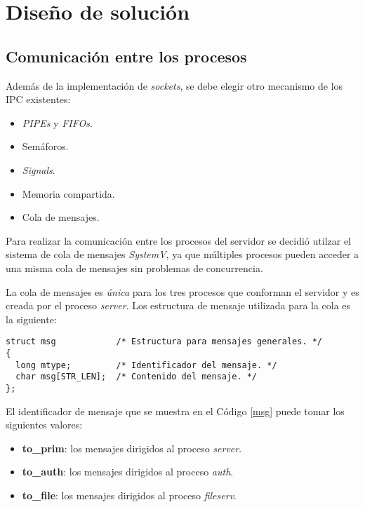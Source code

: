 \documentclass[12pt,a4paper]{article}
\begin{document}
\newpage

\section{Diseño de solución}
\label{solucion}

\subsection{Comunicación entre los procesos}
\label{ipc}
Además de la implementación de \emph{sockets}, se debe elegir
otro mecanismo de los IPC existentes:

\begin{itemize}[leftmargin=1.5cm]
  \item \emph{PIPEs} y \emph{FIFOs}.
  \item Semáforos.
  \item \emph{Signals}.
  \item Memoria compartida.
  \item Cola de mensajes.
\end{itemize}

Para realizar la comunicación entre los procesos del servidor se
decidió utilzar el sistema de cola de mensajes \emph{SystemV}, ya
que múltiples procesos pueden acceder a una misma cola de mensajes
sin problemas de concurrencia.

La cola de mensajes es \emph{única} para los tres procesos que
conforman el servidor y es creada por el proceso \emph{server}.
Los estructura de mensaje utilizada para la cola es la siguiente:

\begin{lstlisting}[caption={Estructura de mensaje.}, label={msg}, language=Ce]
struct msg            /* Estructura para mensajes generales. */
{
  long mtype;         /* Identificador del mensaje. */
  char msg[STR_LEN];  /* Contenido del mensaje. */
};
\end{lstlisting}

El identificador de mensaje que se muestra en el Código \ref{msg}
puede tomar los siguientes valores:

\begin{itemize}[leftmargin=1.5cm]
  \item \textbf{to\_prim}: los mensajes dirigidos al proceso
  \emph{server}.
  \item \textbf{to\_auth}: los mensajes dirigidos al proceso
  \emph{auth}.
  \item \textbf{to\_file}: los mensajes dirigidos al proceso
  \emph{fileserv}.
\end{itemize}
\end{document}
